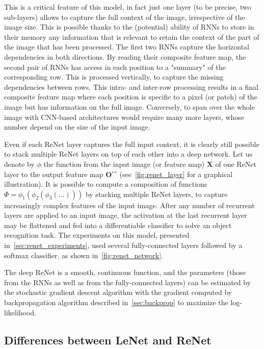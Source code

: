 This is a critical feature of this model, in fact just one layer (to be
precise, two sub-layers) allows to capture the full context of the image,
irrespective of the image size. This is possible thanks to the (potential)
ability of RNNs to store in their memory any information that is relevant to
retain the context of the part of the image that has been processed. The first
two RNNs capture the horizontal dependencies in both directions. By reading
their composite feature map, the second pair of RNNs has access in each
position to a "summary" of the corresponding row. This is processed vertically,
to capture the missing dependencies between rows. This intra- and inter-row
processing results in a final composite feature map where each position is
specific to a pixel (or patch) of the image but has information on the full
image. Conversely, to span over the whole image with CNN-based architectures
would require many more layers, whose number depend on the size of the input
image.

Even if each ReNet layer captures the full input context, it is clearly still
possible to stack multiple ReNet layers on top of each other into a deep
network. Let us denote by $\phi$ the function from the input image (or feature
map) $\mathbf{X}$ of one ReNet layer to the output feature map
$\mathbf{O}^\leftrightarrow$ (see~\autoref{fig:renet_layer} for a graphical
illustration). It is possible to compute a composition of functions $\Phi =
\phi_1(\phi_2(\phi_3(\dots)))$ by stacking multiple ReNet layers, to capture
increasingly complex features of the input image.  After any number of
recurrent layers are applied to an input image, the activation at the last
recurrent layer may be flattened and fed into a differentiable classifier to
solve an object recognition task. The experiments on this model, presented
in~\autoref{sec:renet_experiments}, used several fully-connected layers
followed by a softmax classifier, as shown in~\autoref{fig:renet_network}.

The deep ReNet is a smooth, continuous function, and the parameters (those from
the RNNs as well as from the fully-connected layers) can be estimated by the
stochastic gradient descent algorithm with the gradient computed by
backpropagation algorithm described in~\autoref{sec:backprop} to maximize the
log-likelihood.

\subsection{Differences between LeNet and ReNet}\label{sec:lenetrenet}

